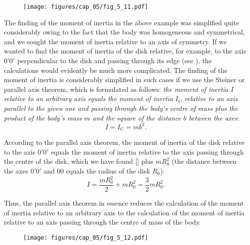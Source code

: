 \begin{figure}[t]
	\begin{center}
		\texttt{[image: figures/cap\_05/fig\_5\_11.pdf]}
		\caption[]{}
		\label{fig:5_11}
	\end{center}
\vspace{-1.0cm}
\end{figure}

The finding of the moment of inertia in the above example was simplified quite considerably owing to the fact that the body was homogeneous and symmetrical, and we sought the moment of inertia relative to an axis of symmetry. If we wanted to find the moment of inertia of the disk relative, for example, to the axis $0'0'$ perpendicular to the disk and passing through its edge (see ), the calculations would evidently be much more complicated. The finding of the moment of inertia is considerably simplified in such cases if we use the Steiner or parallel axis theorem, which is formulated as follows: \textit{the moment of inertia $I$ relative to an arbitrary axis equals the moment of inertia $I_{\text{C}}$ relative to an axis parallel to the given one and passing through the body's centre of mass plus the product of the body's mass $m$ and the square of the distance $b$ between the axes}:
\begin{equation}\label{eq:5_23}
I = I_{\text{C}}= mb^2.
\end{equation}

According to the parallel axis theorem, the moment of inertia of the disk relative to the axis $0'0'$ equals the moment of inertia relative to the axis passing through the centre of the disk, which we have found [] plus $mR_0^2$ (the distance between the axes $0'0'$ and $00$ equals the radius of the disk $R_0$):
\begin{equation*}
I = \frac{mR^2_0}{2} + mR_0^2 = \frac{3}{2}mR_0^2.
\end{equation*}

Thus, the parallel axis theorem in essence reduces the calculation of the moment of inertia relative to an arbitrary axis to the calculation of the moment of inertia relative to an axis passing through the centre of mass of the body.

\begin{figure}[t]
	\begin{center}
		\texttt{[image: figures/cap\_05/fig\_5\_12.pdf]}
		\caption[]{}
		\label{fig:5_12}
	\end{center}
\vspace{-1.0cm}
\end{figure}

